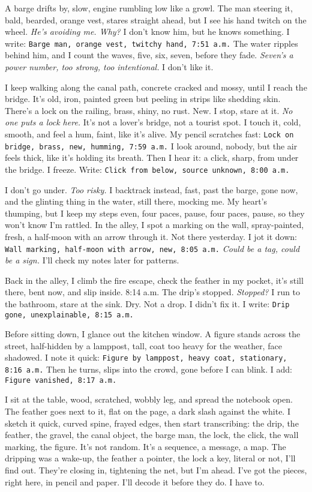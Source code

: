 \documentclass[12pt,oneside]{book}
\newcommand{\note}[1]{\texttt{#1}}
\begin{document}
A barge drifts by, slow, engine rumbling low like a growl. The man steering it, bald, bearded, orange vest, stares straight ahead, but I see his hand twitch on the wheel. \textit{He’s avoiding me. Why?} I don’t know him, but he knows something. I write: \note{Barge man, orange vest, twitchy hand, 7:51 a.m.} The water ripples behind him, and I count the waves, five, six, seven, before they fade. \textit{Seven’s a power number, too strong, too intentional.} I don’t like it.

I keep walking along the canal path, concrete cracked and mossy, until I reach the bridge. It’s old, iron, painted green but peeling in strips like shedding skin. There’s a lock on the railing, brass, shiny, no rust. New. I stop, stare at it. \textit{No one puts a lock here.} It’s not a lover’s bridge, not a tourist spot. I touch it, cold, smooth, and feel a hum, faint, like it’s alive. My pencil scratches fast: \note{Lock on bridge, brass, new, humming, 7:59 a.m.} I look around, nobody, but the air feels thick, like it’s holding its breath. Then I hear it: a click, sharp, from under the bridge. I freeze. Write: \note{Click from below, source unknown, 8:00 a.m.}

I don’t go under. \textit{Too risky.} I backtrack instead, fast, past the barge, gone now, and the glinting thing in the water, still there, mocking me. My heart’s thumping, but I keep my steps even, four paces, pause, four paces, pause, so they won’t know I’m rattled. In the alley, I spot a marking on the wall, spray-painted, fresh, a half-moon with an arrow through it. Not there yesterday. I jot it down: \note{Wall marking, half-moon with arrow, new, 8:05 a.m.} \textit{Could be a tag, could be a sign.} I’ll check my notes later for patterns.

Back in the alley, I climb the fire escape, check the feather in my pocket, it’s still there, bent now, and slip inside. 8:14 a.m. The drip’s stopped. \textit{Stopped?} I run to the bathroom, stare at the sink. Dry. Not a drop. I didn’t fix it. I write: \note{Drip gone, unexplainable, 8:15 a.m.}

Before sitting down, I glance out the kitchen window. A figure stands across the street, half-hidden by a lamppost, tall, coat too heavy for the weather, face shadowed. I note it quick: \note{Figure by lamppost, heavy coat, stationary, 8:16 a.m.} Then he turns, slips into the crowd, gone before I can blink. I add: \note{Figure vanished, 8:17 a.m.}

I sit at the table, wood, scratched, wobbly leg, and spread the notebook open. The feather goes next to it, flat on the page, a dark slash against the white. I sketch it quick, curved spine, frayed edges, then start transcribing: the drip, the feather, the gravel, the canal object, the barge man, the lock, the click, the wall marking, the figure. It’s not random. It’s a sequence, a message, a map. The dripping was a wake-up, the feather a pointer, the lock a key, literal or not, I’ll find out. They’re closing in, tightening the net, but I’m ahead. I’ve got the pieces, right here, in pencil and paper. I’ll decode it before they do. I have to.
\end{document}
